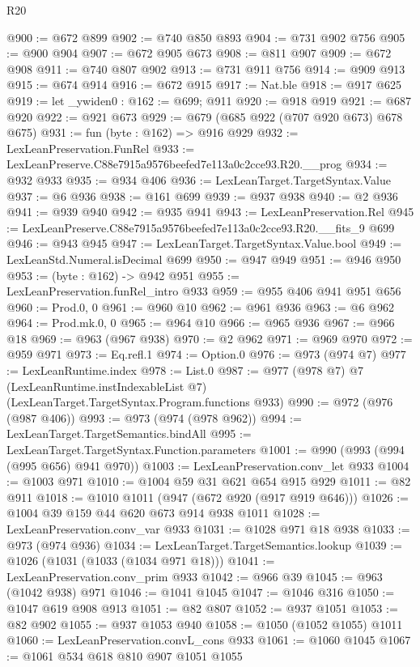 \begin{lexlean}{R20}
\begin{coremodule}
@900 := @672 @899
@902 := @740 @850 @893
@904 := @731 @902 @756
@905 := @900 @904
@907 := @672 @905 @673
@908 := @811 @907
@909 := @672 @908
@911 := @740 @807 @902
@913 := @731 @911 @756
@914 := @909 @913
@915 := @674 @914
@916 := @672 @915
@917 := Nat.ble
@918 := @917 @625
@919 := let _ywiden0 : @162 := @699; @911
@920 := @918 @919
@921 := @687 @920
@922 := @921 @673
@929 := @679 (@685 @922 (@707 @920 @673) @678 @675)
@931 := fun (byte : @162) => @916 @929
@932 := LexLeanPreservation.FunRel
@933 := LexLeanPreserve.C88e7915a9576beefed7e113a0c2cce93.R20.__prog
@934 := @932 @933
@935 := @934 @406
@936 := LexLeanTarget.TargetSyntax.Value
@937 := @6 @936
@938 := @161 @699
@939 := @937 @938
@940 := @2 @936
@941 := @939 @940
@942 := @935 @941
@943 := LexLeanPreservation.Rel
@945 := LexLeanPreserve.C88e7915a9576beefed7e113a0c2cce93.R20.__fits_9 @699
@946 := @943 @945
@947 := LexLeanTarget.TargetSyntax.Value.bool
@949 := LexLeanStd.Numeral.isDecimal @699
@950 := @947 @949
@951 := @946 @950
@953 := (byte : @162) -> @942 @951
@955 := LexLeanPreservation.funRel_intro @933
@959 := @955 @406 @941 @951 @656
@960 := Prod.{0, 0}
@961 := @960 @10
@962 := @961 @936
@963 := @6 @962
@964 := Prod.mk.{0, 0}
@965 := @964 @10
@966 := @965 @936
@967 := @966 @18
@969 := @963 (@967 @938)
@970 := @2 @962
@971 := @969 @970
@972 := @959 @971
@973 := Eq.refl.{1}
@974 := Option.{0}
@976 := @973 (@974 @7)
@977 := LexLeanRuntime.index
@978 := List.{0}
@987 := @977
    (@978 @7)
    @7
    (LexLeanRuntime.instIndexableList @7)
    (LexLeanTarget.TargetSyntax.Program.functions @933)
@990 := @972 (@976 (@987 @406))
@993 := @973 (@974 (@978 @962))
@994 := LexLeanTarget.TargetSemantics.bindAll
@995 := LexLeanTarget.TargetSyntax.Function.parameters
@1001 := @990 (@993 (@994 (@995 @656) @941 @970))
@1003 := LexLeanPreservation.conv_let @933
@1004 := @1003 @971
@1010 := @1004 @59 @31 @621 @654 @915 @929
@1011 := @82 @911
@1018 := @1010 @1011 (@947 (@672 @920 (@917 @919 @646)))
@1026 := @1004 @39 @159 @44 @620 @673 @914 @938 @1011
@1028 := LexLeanPreservation.conv_var @933
@1031 := @1028 @971 @18 @938
@1033 := @973 (@974 @936)
@1034 := LexLeanTarget.TargetSemantics.lookup
@1039 := @1026 (@1031 (@1033 (@1034 @971 @18)))
@1041 := LexLeanPreservation.conv_prim @933
@1042 := @966 @39
@1045 := @963 (@1042 @938) @971
@1046 := @1041 @1045
@1047 := @1046 @316
@1050 := @1047 @619 @908 @913
@1051 := @82 @807
@1052 := @937 @1051
@1053 := @82 @902
@1055 := @937 @1053 @940
@1058 := @1050 (@1052 @1055) @1011
@1060 := LexLeanPreservation.convL_cons @933
@1061 := @1060 @1045
@1067 := @1061 @534 @618 @810 @907 @1051 @1055

\end{coremodule}
\end{lexlean}
